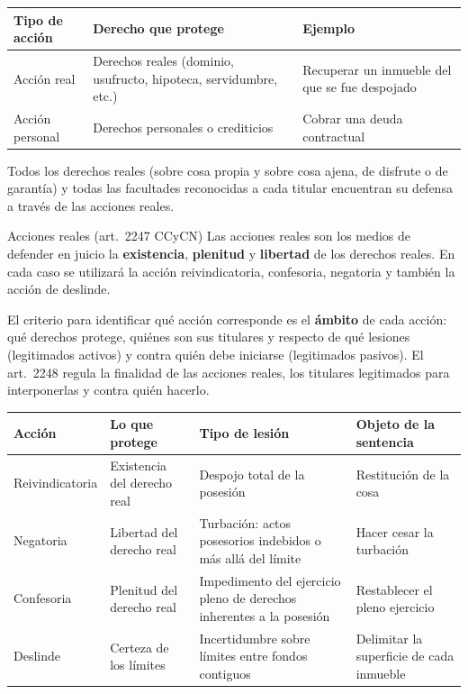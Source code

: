 \documentclass[12pt,oneside]{book}
\begin{document}
\begin{table}[H]
\centering
\begin{tabularx}{\textwidth}{@{}>{\raggedright\arraybackslash}p{}>{\raggedright\arraybackslash}X>{\raggedright\arraybackslash}X@{}}
\toprule
\textbf{Tipo de acción} & \textbf{Derecho que protege} & \textbf{Ejemplo} \\
\midrule
Acción real & Derechos reales (dominio, usufructo, hipoteca, servidumbre, etc.) & Recuperar un inmueble del que se fue despojado \\
Acción personal & Derechos personales o crediticios & Cobrar una deuda contractual \\
\bottomrule
\end{tabularx}
\end{table}

Todos los derechos reales (sobre cosa propia y sobre cosa ajena, de disfrute o de garantía) y todas las facultades reconocidas a cada titular encuentran su defensa a través de las acciones reales.

\begin{definicion}{Acciones reales (art.~2247 CCyCN)}
Las acciones reales son los medios de defender en juicio la \textbf{existencia}, \textbf{plenitud} y \textbf{libertad} de los derechos reales. En cada caso se utilizará la acción reivindicatoria, confesoria, negatoria y también la acción de deslinde.
\end{definicion}

El criterio para identificar qué acción corresponde es el \textbf{ámbito} de cada acción: qué derechos protege, quiénes son sus titulares y respecto de qué lesiones (legitimados activos) y contra quién debe iniciarse (legitimados pasivos). El art.~2248 regula la finalidad de las acciones reales, los titulares legitimados para interponerlas y contra quién hacerlo.

\begin{table}[H]
\centering
\small
\begin{tabularx}{\textwidth}{@{}>{\raggedright\arraybackslash}p{}>{\raggedright\arraybackslash}X>{\raggedright\arraybackslash}X>{\raggedright\arraybackslash}X@{}}
\toprule
\textbf{Acción} & \textbf{Lo que protege} & \textbf{Tipo de lesión} & \textbf{Objeto de la sentencia} \\
\midrule
Reivindicatoria & Existencia del derecho real & Despojo total de la posesión & Restitución de la cosa \\
Negatoria & Libertad del derecho real & Turbación: actos posesorios indebidos o más allá del límite & Hacer cesar la turbación \\
Confesoria & Plenitud del derecho real & Impedimento del ejercicio pleno de derechos inherentes a la posesión & Restablecer el pleno ejercicio \\
Deslinde & Certeza de los límites & Incertidumbre sobre límites entre fondos contiguos & Delimitar la superficie de cada inmueble \\
\bottomrule
\end{tabularx}
\end{table}
\end{document}
